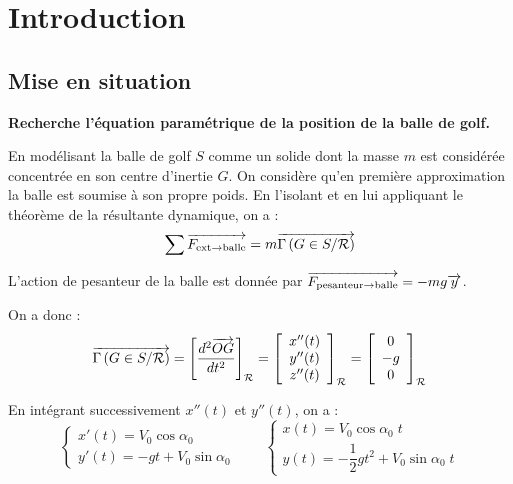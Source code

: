 \documentclass[10pt,fleqn]{article} %
\begin{document}




\section{Introduction}
\subsection{Mise en situation}

\textbf{Recherche l'équation paramétrique de la position de la balle de golf.}


En modélisant la balle de golf \textbf{$S$} comme un solide dont la masse $m$ est considérée concentrée en son centre d'inertie $G$. On considère qu'en première approximation la balle est soumise à son propre poids.%
En l'isolant et en lui appliquant le théorème de la résultante dynamique, on a :
$$
\sum \overrightarrow{F_{\text{ext}\rightarrow \text{balle}}} = m\overrightarrow{\Gamma \left( {G} \in {S}/{\mathcal{R}}\right)}
$$

L'action de pesanteur de la balle est donnée par $\overrightarrow{F_{\text{pesanteur}\rightarrow \text{balle}}} = -mg\overrightarrow{y}$.


On a donc :
$$\overrightarrow{\Gamma \left( {G} \in {S}/{\mathcal{R}}\right)} = \left[ \dfrac{d^2 \overrightarrow{OG}}{dt^2}\right]_{\mathcal{R}}
=\left[ \begin{array}{c}
x''(t) \\ y''(t) \\ z''(t)
\end{array}\right]_{\mathcal{R}}
=\left[ \begin{array}{c}
0 \\ -g \\ 0
\end{array}\right]_{\mathcal{R}}
$$

En intégrant successivement $x''(t)$ et $y''(t)$, on a : 
$$
\left\{ 
\begin{array}{l}
x'(t) =  V_0 \cos\alpha_0\\ 
y'(t) =  -gt +V_0 \sin\alpha_0
\end{array}
\right.
\quad
\quad
\left\{ 
\begin{array}{l}
x(t) = V_0 \cos\alpha_0 \; t \\ 
y(t) = -\dfrac{1}{2}gt^2 +  V_0 \sin\alpha_0 \; t
\end{array}
\right.
$$
\end{document}
